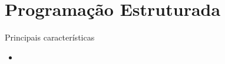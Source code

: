 \section{Programação Estruturada}

\begin{frame}[fragile]{Principais características}

    \begin{itemize}
        \item
    \end{itemize}

\end{frame}
